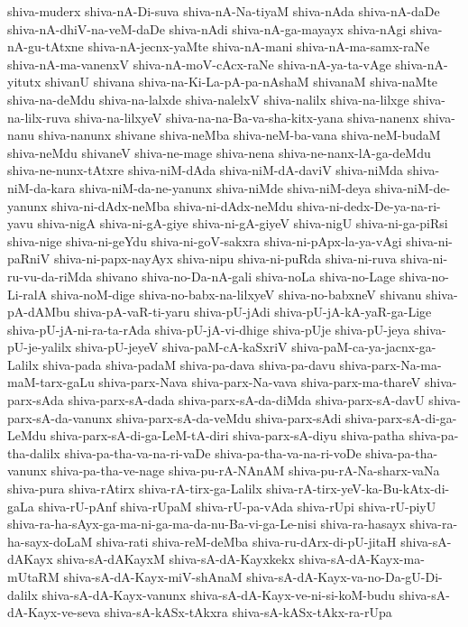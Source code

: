 {shiva-muderx
shiva-nA-Di-suva
shiva-nA-Na-tiyaM
shiva-nAda
shiva-nA-daDe
shiva-nA-dhiV-na-veM-daDe
shiva-nAdi
shiva-nA-ga-mayayx
shiva-nAgi
shiva-nA-gu-tAtxne
shiva-nA-jecnx-yaMte
shiva-nA-mani
shiva-nA-ma-samx-raNe
shiva-nA-ma-vanenxV
shiva-nA-moV-cAcx-raNe
shiva-nA-ya-ta-vAge
shiva-nA-yitutx
shivanU
shivana
shiva-na-Ki-La-pA-pa-nAshaM
shivanaM
shiva-naMte
shiva-na-deMdu
shiva-na-lalxde
shiva-nalelxV
shiva-nalilx
shiva-na-lilxge
shiva-na-lilx-ruva
shiva-na-lilxyeV
shiva-na-na-Ba-va-sha-kitx-yana
shiva-nanenx
shiva-nanu
shiva-nanunx
shivane
shiva-neMba
shiva-neM-ba-vana
shiva-neM-budaM
shiva-neMdu
shivaneV
shiva-ne-mage
shiva-nena
shiva-ne-nanx-lA-ga-deMdu
shiva-ne-nunx-tAtxre
shiva-niM-dAda
shiva-niM-dA-daviV
shiva-niMda
shiva-niM-da-kara
shiva-niM-da-ne-yanunx
shiva-niMde
shiva-niM-deya
shiva-niM-de-yanunx
shiva-ni-dAdx-neMba
shiva-ni-dAdx-neMdu
shiva-ni-dedx-De-ya-na-ri-yavu
shiva-nigA
shiva-ni-gA-giye
shiva-ni-gA-giyeV
shiva-nigU
shiva-ni-ga-piRsi
shiva-nige
shiva-ni-geYdu
shiva-ni-goV-sakxra
shiva-ni-pApx-la-ya-vAgi
shiva-ni-paRniV
shiva-ni-papx-nayAyx
shiva-nipu
shiva-ni-puRda
shiva-ni-ruva
shiva-ni-ru-vu-da-riMda
shivano
shiva-no-Da-nA-gali
shiva-noLa
shiva-no-Lage
shiva-no-Li-ralA
shiva-noM-dige
shiva-no-babx-na-lilxyeV
shiva-no-babxneV
shivanu
shiva-pA-dAMbu
shiva-pA-vaR-ti-yaru
shiva-pU-jAdi
shiva-pU-jA-kA-yaR-ga-Lige
shiva-pU-jA-ni-ra-ta-rAda
shiva-pU-jA-vi-dhige
shiva-pUje
shiva-pU-jeya
shiva-pU-je-yalilx
shiva-pU-jeyeV
shiva-paM-cA-kaSxriV
shiva-paM-ca-ya-jacnx-ga-Lalilx
shiva-pada
shiva-padaM
shiva-pa-dava
shiva-pa-davu
shiva-parx-Na-ma-maM-tarx-gaLu
shiva-parx-Nava
shiva-parx-Na-vava
shiva-parx-ma-thareV
shiva-parx-sAda
shiva-parx-sA-dada
shiva-parx-sA-da-diMda
shiva-parx-sA-davU
shiva-parx-sA-da-vanunx
shiva-parx-sA-da-veMdu
shiva-parx-sAdi
shiva-parx-sA-di-ga-LeMdu
shiva-parx-sA-di-ga-LeM-tA-diri
shiva-parx-sA-diyu
shiva-patha
shiva-pa-tha-dalilx
shiva-pa-tha-va-na-ri-vaDe
shiva-pa-tha-va-na-ri-voDe
shiva-pa-tha-vanunx
shiva-pa-tha-ve-nage
shiva-pu-rA-NAnAM
shiva-pu-rA-Na-sharx-vaNa
shiva-pura
shiva-rAtirx
shiva-rA-tirx-ga-Lalilx
shiva-rA-tirx-yeV-ka-Bu-kAtx-di-gaLa
shiva-rU-pAnf
shiva-rUpaM
shiva-rU-pa-vAda
shiva-rUpi
shiva-rU-piyU
shiva-ra-ha-sAyx-ga-ma-ni-ga-ma-da-nu-Ba-vi-ga-Le-nisi
shiva-ra-hasayx
shiva-ra-ha-sayx-doLaM
shiva-rati
shiva-reM-deMba
shiva-ru-dArx-di-pU-jitaH
shiva-sA-dAKayx
shiva-sA-dAKayxM
shiva-sA-dA-Kayxkekx
shiva-sA-dA-Kayx-ma-mUtaRM
shiva-sA-dA-Kayx-miV-shAnaM
shiva-sA-dA-Kayx-va-no-Da-gU-Di-dalilx
shiva-sA-dA-Kayx-vanunx
shiva-sA-dA-Kayx-ve-ni-si-koM-budu
shiva-sA-dA-Kayx-ve-seva
shiva-sA-kASx-tAkxra
shiva-sA-kASx-tAkx-ra-rUpa
}
